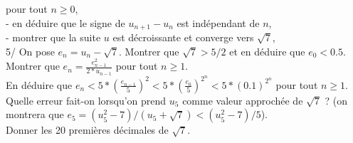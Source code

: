 \documentclass[a4paper,11pt]{book}
\begin{document}
pour tout $n \geq 0$,\\
- en d\'eduire que le signe de $u_{n+1}-u_n$ est ind\'ependant de $n$,\\
- montrer que la suite $u$ est d\'ecroissante et converge vers $\sqrt 7$,\\
5/ On pose $e_n=u_n-\sqrt 7$. Montrer que $\sqrt 7>5/2$ et en d\'eduire que 
$e_0<0.5$.\\ 
Montrer que $\displaystyle e_n=\frac{e_{n-1}^2}{2*u_{n-1}}$ pour tout $n \geq 1$.\\ 
En d\'eduire que $\displaystyle e_n <  5*(\frac{e_{n-1}}{5})^2 < 5*(\frac{e_0}{5})^{2^{n}}<
5*(0.1)^{2^{n}}$ pour tout $n \geq 1$.\\
Quelle erreur fait-on lorsqu'on prend $u_5$ comme valeur approch\'ee de 
$\sqrt 7$ ? (on montrera que $e_5=(u_5^2-7)/(u_5+\sqrt 7)<(u_5^2-7)/5$).\\
Donner les 20 premi\`eres d\'ecimales de $\sqrt 7$.
\end{document}
